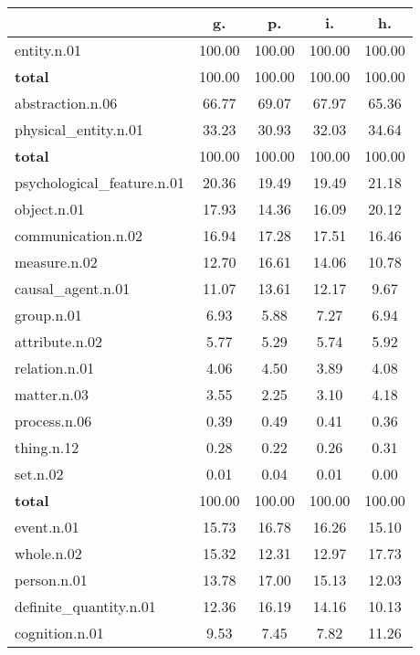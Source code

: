 \begin{table}[h!]
\begin{center}
\begin{tabular}{| l || c | c | c | c |}\hline
 & {\bf g.} & {\bf p.} & {\bf i.} & {\bf h.} \\\hline\hline
entity.n.01 & 100.00  & 100.00  & 100.00  & 100.00 \\\hline\hline
{{\bf total}} & 100.00  & 100.00  & 100.00  & 100.00 \\\hline\hline\hline
abstraction.n.06 & 66.77  & 69.07  & 67.97  & 65.36 \\\hline
physical\_entity.n.01 & 33.23  & 30.93  & 32.03  & 34.64 \\\hline\hline
{{\bf total}} & 100.00  & 100.00  & 100.00  & 100.00 \\\hline\hline\hline
psychological\_feature.n.01 & 20.36  & 19.49  & 19.49  & 21.18 \\\hline
object.n.01 & 17.93  & 14.36  & 16.09  & 20.12 \\\hline
communication.n.02 & 16.94  & 17.28  & 17.51  & 16.46 \\\hline
measure.n.02 & 12.70  & 16.61  & 14.06  & 10.78 \\\hline
causal\_agent.n.01 & 11.07  & 13.61  & 12.17  & 9.67 \\\hline
group.n.01 & 6.93  & 5.88  & 7.27  & 6.94 \\\hline
attribute.n.02 & 5.77  & 5.29  & 5.74  & 5.92 \\\hline
relation.n.01 & 4.06  & 4.50  & 3.89  & 4.08 \\\hline
matter.n.03 & 3.55  & 2.25  & 3.10  & 4.18 \\\hline
process.n.06 & 0.39  & 0.49  & 0.41  & 0.36 \\\hline
thing.n.12 & 0.28  & 0.22  & 0.26  & 0.31 \\\hline
set.n.02 & 0.01  & 0.04  & 0.01  & 0.00 \\\hline\hline
{{\bf total}} & 100.00  & 100.00  & 100.00  & 100.00 \\\hline\hline\hline
event.n.01 & 15.73  & 16.78  & 16.26  & 15.10 \\\hline
whole.n.02 & 15.32  & 12.31  & 12.97  & 17.73 \\\hline
person.n.01 & 13.78  & 17.00  & 15.13  & 12.03 \\\hline
definite\_quantity.n.01 & 12.36  & 16.19  & 14.16  & 10.13 \\\hline
cognition.n.01 & 9.53  & 7.45  & 7.82  & 11.26 \\\hline

\end{tabular}
\end{center}
\end{table}
